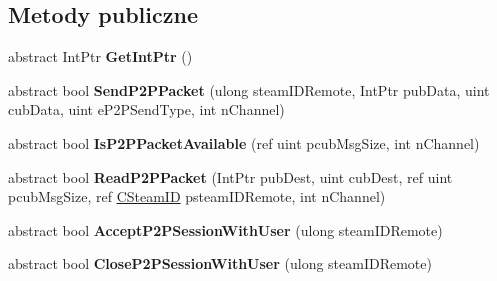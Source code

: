 \subsection*{Metody publiczne}
\begin{DoxyCompactItemize}
\item 
\mbox{\label{class_valve_1_1_steamworks_1_1_i_steam_networking_a3a4a43c494702182e2176cdaa1e7552f}} 
abstract Int\+Ptr {\bfseries Get\+Int\+Ptr} ()
\item 
\mbox{\label{class_valve_1_1_steamworks_1_1_i_steam_networking_ae87925e76d6f39b23a722ff476e29800}} 
abstract bool {\bfseries Send\+P2\+P\+Packet} (ulong steam\+I\+D\+Remote, Int\+Ptr pub\+Data, uint cub\+Data, uint e\+P2\+P\+Send\+Type, int n\+Channel)
\item 
\mbox{\label{class_valve_1_1_steamworks_1_1_i_steam_networking_a9d7a294dcb7754ca0d44a715ccee36f7}} 
abstract bool {\bfseries Is\+P2\+P\+Packet\+Available} (ref uint pcub\+Msg\+Size, int n\+Channel)
\item 
\mbox{\label{class_valve_1_1_steamworks_1_1_i_steam_networking_ac55ed4a4f96a23f5a9a01d31781614b7}} 
abstract bool {\bfseries Read\+P2\+P\+Packet} (Int\+Ptr pub\+Dest, uint cub\+Dest, ref uint pcub\+Msg\+Size, ref \hyperlink{struct_valve_1_1_steamworks_1_1_c_steam_i_d}{C\+Steam\+ID} psteam\+I\+D\+Remote, int n\+Channel)
\item 
\mbox{\label{class_valve_1_1_steamworks_1_1_i_steam_networking_a64aeaddce0b3a7957cf90a54d1e95f25}} 
abstract bool {\bfseries Accept\+P2\+P\+Session\+With\+User} (ulong steam\+I\+D\+Remote)
\item 
\mbox{\label{class_valve_1_1_steamworks_1_1_i_steam_networking_a7960ee3d85348e4b49fb98447aef7762}} 
abstract bool {\bfseries Close\+P2\+P\+Session\+With\+User} (ulong steam\+I\+D\+Remote)
\item 
\mbox{\label{class_valve_1_1_steamworks_1_1_i_steam_networking_a8b782572a8c89ee220008042c6d77a7e}} 

\end{DoxyCompactItemize}
